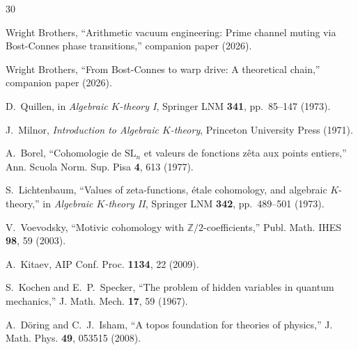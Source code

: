 \documentclass[aps,prd,twocolumn,superscriptaddress,nofootinbib]{revtex4-2}
\begin{document}
\begin{thebibliography}{30}

Wright Brothers,
``Arithmetic vacuum engineering: Prime channel muting via
Bost-Connes phase transitions,''
companion paper (2026).

Wright Brothers,
``From Bost-Connes to warp drive: A theoretical chain,''
companion paper (2026).

D.~Quillen,
in \emph{Algebraic $K$-theory I}, Springer LNM \textbf{341},
pp.~85--147 (1973).

J.~Milnor,
\emph{Introduction to Algebraic $K$-theory},
Princeton University Press (1971).

A.~Borel,
``Cohomologie de $\mathrm{SL}_n$ et valeurs de fonctions z\^eta
aux points entiers,''
Ann. Scuola Norm. Sup. Pisa \textbf{4}, 613 (1977).

S.~Lichtenbaum,
``Values of zeta-functions, \'etale cohomology, and algebraic
$K$-theory,''
in \emph{Algebraic $K$-theory II}, Springer LNM \textbf{342},
pp.~489--501 (1973).

V.~Voevodsky,
``Motivic cohomology with $\mathbb{Z}/2$-coefficients,''
Publ. Math. IHES \textbf{98}, 59 (2003).

A.~Kitaev,
AIP Conf. Proc. \textbf{1134}, 22 (2009).

S.~Kochen and E.~P.~Specker,
``The problem of hidden variables in quantum mechanics,''
J. Math. Mech. \textbf{17}, 59 (1967).

A.~D\"oring and C.~J.~Isham,
``A topos foundation for theories of physics,''
J. Math. Phys. \textbf{49}, 053515 (2008).

\end{thebibliography}
\end{document}
